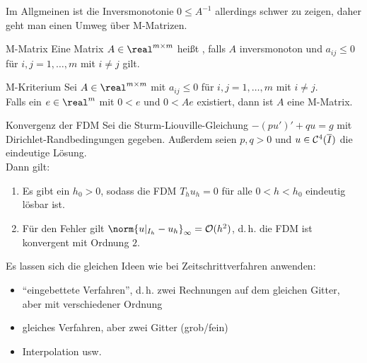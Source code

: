 \begin{Bem}
    Im Allgmeinen ist die Inversmonotonie $0 \le A^{-1}$ allerdings
    schwer zu zeigen, daher geht man einen Umweg über M-Matrizen.
\end{Bem}

\begin{Def}{M-Matrix}
    Eine Matrix $A \in \real^{m \times m}$ heißt , falls
    $A$ inversmonoton und $a_{ij} \le 0$ für
    $i, j = 1, \dotsc, m$ mit $i \not= j$ gilt.
\end{Def}

\begin{Satz}{M-Kriterium}
    Sei $A \in \real^{m \times m}$ mit $a_{ij} \le 0$ für
    $i, j = 1, \dotsc, m$ mit $i \not= j$.\\
    Falls ein $e \in \real^m$ mit $0 < e$ und $0 < Ae$ existiert, dann ist
    $A$ eine M-Matrix.
\end{Satz}

\linie

\begin{Satz}{Konvergenz der FDM}
    Sei die Sturm-Liouville-Gleichung $-(pu')' + qu = g$ mit
    Dirichlet-Randbedingungen gegeben.
    Außerdem seien $p, q > 0$ und $u \in \mathcal{C}^4(\overline{I})$ die eindeutige
    Lösung.\\
    Dann gilt:
    \begin{enumerate}[label=(\emph{\roman*})]
        \item
        Es gibt ein $h_0 > 0$, sodass die FDM $T_h u_h = 0$ für alle
        $0 < h < h_0$ eindeutig lösbar ist.

        \item
        Für den Fehler gilt $\norm{u|_{I_h} - u_h}_\infty = \O(h^2)$,
        d.\,h. die FDM ist konvergent mit Ordnung $2$.
    \end{enumerate}
\end{Satz}

\linie

\begin{Bem}
    Es lassen sich die gleichen Ideen wie bei Zeitschrittverfahren anwenden:
    \begin{itemize}
        \item
        "`eingebettete Verfahren"', d.\,h. zwei Rechnungen auf dem gleichen
        Gitter, aber mit verschiedener Ordnung

        \item
        gleiches Verfahren, aber zwei Gitter (grob/fein)

        \item
        Interpolation usw.
    \end{itemize}
\end{Bem}

